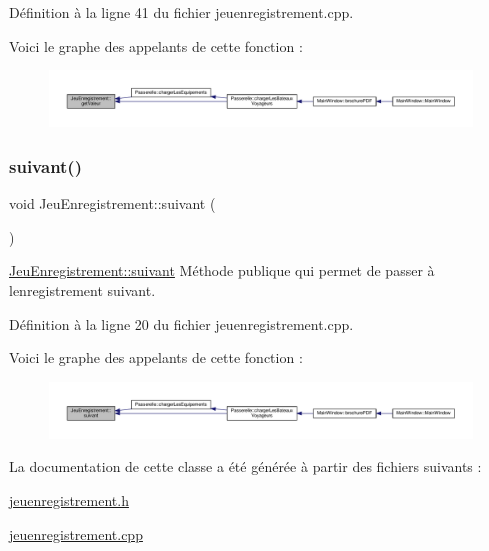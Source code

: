 Définition à la ligne 41 du fichier jeuenregistrement.\+cpp.

Voici le graphe des appelants de cette fonction \+:\nopagebreak
\begin{figure}[H]
\begin{center}
\leavevmode
\includegraphics[width=350pt]{class_jeu_enregistrement_aa19979b7af9747ae05e8e40f7747bbed_icgraph}
\end{center}
\end{figure}
\mbox{\label{class_jeu_enregistrement_a4ac6b1c725cbb52f5320c514b7d65b71}} 
\subsubsection{\texorpdfstring{suivant()}{suivant()}}
{\footnotesize\ttfamily void Jeu\+Enregistrement\+::suivant (\begin{DoxyParamCaption}{ }\end{DoxyParamCaption})}



\hyperlink{class_jeu_enregistrement_a4ac6b1c725cbb52f5320c514b7d65b71}{Jeu\+Enregistrement\+::suivant} Méthode publique qui permet de passer à l\textquotesingle{}enregistrement suivant. 



Définition à la ligne 20 du fichier jeuenregistrement.\+cpp.

Voici le graphe des appelants de cette fonction \+:\nopagebreak
\begin{figure}[H]
\begin{center}
\leavevmode
\includegraphics[width=350pt]{class_jeu_enregistrement_a4ac6b1c725cbb52f5320c514b7d65b71_icgraph}
\end{center}
\end{figure}


La documentation de cette classe a été générée à partir des fichiers suivants \+:\begin{DoxyCompactItemize}
\item 
\hyperlink{jeuenregistrement_8h}{jeuenregistrement.\+h}\item 
\hyperlink{jeuenregistrement_8cpp}{jeuenregistrement.\+cpp}\end{DoxyCompactItemize}
